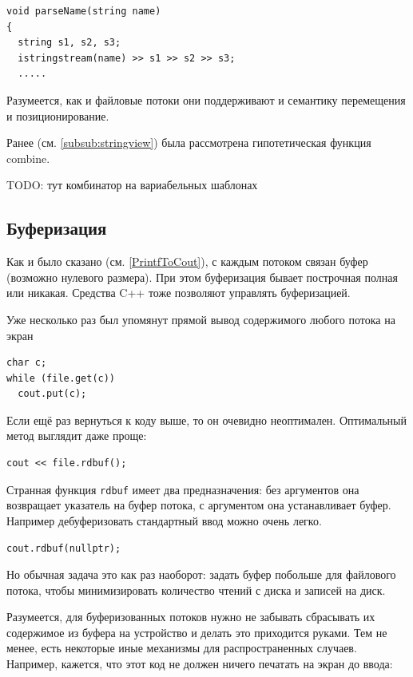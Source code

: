 \documentclass[a4paper,12pt,oneside]{book}
\begin{document}
\begin{lstlisting}
void parseName(string name)
{
  string s1, s2, s3;
  istringstream(name) >> s1 >> s2 >> s3;
  .....
\end{lstlisting}

Разумеется, как и файловые потоки они поддерживают и семантику перемещения и позиционирование.

Ранее (см. \ref{subsub:stringview}) была рассмотрена гипотетическая функция combine.

TODO: тут комбинатор на вариабельных шаблонах

\subsection{Буферизация}

Как и было сказано (см. \ref{PrintfToCout}), с каждым потоком связан буфер (возможно нулевого размера). При этом буферизация бывает построчная полная или никакая. Средства C++ тоже позволяют управлять буферизацией.

Уже несколько раз был упомянут прямой вывод содержимого любого потока на экран

\begin{lstlisting}
char c;
while (file.get(c)) 
  cout.put(c);
\end{lstlisting}

Если ещё раз вернуться к коду выше, то он очевидно неоптимален. Оптимальный метод выглядит даже проще:

\begin{lstlisting}
cout << file.rdbuf();
\end{lstlisting}

Странная функция \lstinline!rdbuf! имеет два предназначения: без аргументов она возвращает указатель на буфер потока, с аргументом она устанавливает буфер. Например дебуферизовать стандартный ввод можно очень легко.

\begin{lstlisting}
cout.rdbuf(nullptr);
\end{lstlisting}

Но обычная задача это как раз наоборот: задать буфер побольше для файлового потока, чтобы минимизировать количество чтений с диска и записей на диск.

Разумеется, для буферизованных потоков нужно не забывать сбрасывать их содержимое из буфера на устройство и делать это приходится руками. Тем не менее, есть некоторые иные механизмы для распространенных случаев. Например, кажется, что этот код не должен ничего печатать на экран до ввода:
\end{document}
